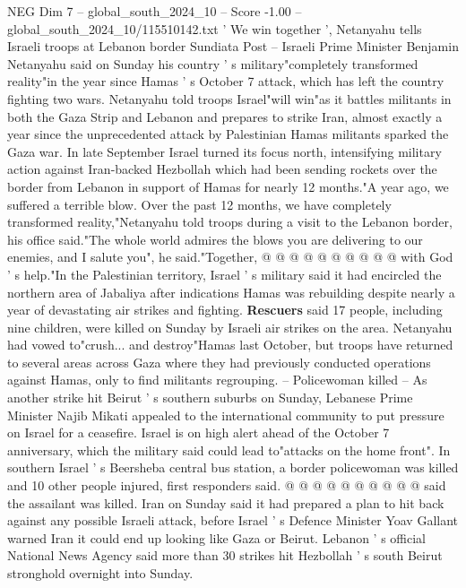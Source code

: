 \begin{textsample}{NEG Dim 7 – global\_south\_2024\_10 – Score -1.00 – global\_south\_2024\_10/115510142.txt}  \label{ex:f7_neg_233}
' We win together ', Netanyahu tells Israeli troops at Lebanon border Sundiata Post -- Israeli Prime Minister Benjamin Netanyahu said on Sunday his country ' s military"completely transformed reality"in the year since Hamas ' s October 7 attack, which has left the country fighting two wars.
Netanyahu told troops Israel"will win"as it battles militants in both the Gaza Strip and Lebanon and prepares to strike Iran, almost exactly a year since the unprecedented attack by Palestinian Hamas militants sparked the Gaza war.
In late September Israel turned its focus north, intensifying military action against Iran-backed Hezbollah which had been sending rockets over the border from Lebanon in support of Hamas for nearly 12 months."A year ago, we suffered a terrible blow.
Over the past 12 months, we have completely transformed reality,"Netanyahu told troops during a visit to the Lebanon border, his office said."The whole world admires the blows you are delivering to our enemies, and I salute you", he said."Together, @ @ @ @ @ @ @ @ @ @ with God ' s help."In the Palestinian territory, Israel ' s military said it had encircled the northern area of Jabaliya after indications Hamas was rebuilding despite nearly a year of devastating air strikes and fighting. \textbf{Rescuers} said 17 people, including nine children, were killed on Sunday by Israeli air strikes on the area.
Netanyahu had vowed to"crush... and destroy"Hamas last October, but troops have returned to several areas across Gaza where they had previously conducted operations against Hamas, only to find militants regrouping. -- Policewoman killed -- As another strike hit Beirut ' s southern suburbs on Sunday, Lebanese Prime Minister Najib Mikati appealed to the international community to put pressure on Israel for a ceasefire.
Israel is on high alert ahead of the October 7 anniversary, which the military said could lead to"attacks on the home front".
In southern Israel ' s Beersheba central bus station, a border policewoman was killed and 10 other people injured, first responders said. @ @ @ @ @ @ @ @ @ @ said the assailant was killed.
Iran on Sunday said it had prepared a plan to hit back against any possible Israeli attack, before Israel ' s Defence Minister Yoav Gallant warned Iran it could end up looking like Gaza or Beirut.
Lebanon ' s official National News Agency said more than 30 strikes hit Hezbollah ' s south Beirut stronghold overnight into Sunday.

\end{textsample}

